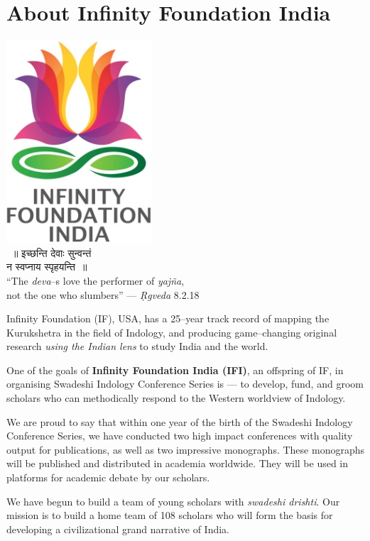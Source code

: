 
\chapter*{About Infinity Foundation India}

\begin{center}
 \includegraphics{images/logo.png}\\
~॥ इच्छन्ति देवाः सुन्वन्तं\\ 
 न स्वप्नाय स्पृहयन्ति~॥\\
 “The \textit{deva}–s love the performer of \textit{yajña},\\ 
 not the one who slumbers” — \textit{Ṛgveda} 8.2.18
\end{center}

Infinity Foundation (IF), USA, has a 25–year track record of mapping the Kurukshetra in the field of Indology, and producing game–changing original research \textit{using the Indian lens} to study India and the world.

One of the goals of \textbf{Infinity Foundation India (IFI)}, an offspring of IF, in organising Swadeshi Indology Conference Series is — to develop, fund, and groom scholars who can methodically respond to the Western worldview of Indology.

We are proud to say that within one year of the birth of the Swadeshi Indology Conference Series, we have conducted two high impact conferences with quality output for publications, as well as two impressive monographs. These monographs will be published and distributed in academia worldwide. They will be used in platforms for academic debate by our scholars.

We have begun to build a team of young scholars with \textit{swadeshi drishti}. Our mission is to build a home team of 108 scholars who will form the basis for developing a civilizational grand narrative of India.

